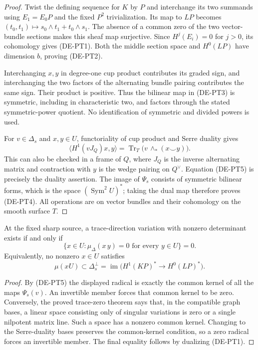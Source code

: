 \begin{proof}
Twist the defining sequence for $K$ by $P$ and interchange its two
summands using $E_1=E_0P$ and the fixed $P^2$ trivialization.
Its map to $LP$ becomes
$(t_0,t_1)\mapsto s_0\wedge t_1+t_0\wedge s_1$.
The absence of a common zero of the two vector-bundle sections makes
this sheaf map surjective. Since $H^j(E_i)=0$ for $j>0$,
its cohomology gives (DE-PT1). Both the middle section space and
$H^0(LP)$ have dimension $b$, proving (DE-PT2).

Interchanging $x,y$ in degree-one cup product contributes its graded
sign, and interchanging the two factors of the alternating bundle
pairing contributes the same sign. Their product is positive.
Thus the bilinear map in (DE-PT3) is symmetric, including in
characteristic two, and factors through the stated symmetric-power
quotient. No identification of symmetric and divided powers is used.

For $v\in\Delta_s$ and $x,y\in U$, functoriality of cup product and
Serre duality gives
\[
\bigl\langle H^1(vJ_Q)x,y\bigr\rangle
=\operatorname{Tr}_T\bigl(v\,\wedge_*(x\mathbin{\smile}y)\bigr).
\tag{DE-PT5}
\]
This can also be checked in a frame of $Q$, where $J_Q$ is the
inverse alternating matrix and contraction with $y$ is the wedge
pairing on $Q^\vee$. Equation (DE-PT5) is precisely the duality
assertion. The image of $\Psi_s$ consists of symmetric bilinear
forms, which is the space $(\operatorname{Sym}^2U)^*$; taking the
dual map therefore proves (DE-PT4). All operations are on vector
bundles and their cohomology on the smooth surface $T$.
\end{proof}

\begin{corollary}
\label{cor:DE-A3-positive-Petri-radical-note}
At the fixed sharp source, a trace-direction variation with nonzero
determinant exists if and only if
\[
\{x\in U:\mu_{\Delta}(x\,y)=0\text{ for every }y\in U\}=0.
\tag{DE-PT6}
\]
Equivalently, no nonzero $x\in U$ satisfies
\[
\mu(xU)\subset\Delta_s^\perp
=\operatorname{im}\bigl(H^1(KP)^*\longrightarrow
H^0(LP)^*\bigr).
\tag{DE-PT7}
\]
\end{corollary}
\begin{proof}
By (DE-PT5) the displayed radical is exactly the common kernel of
all the maps $\Psi_s(v)$. An invertible member forces that common
kernel to be zero. Conversely, the proved trace-zero theorem says
that, in the compatible graph bases, a linear space consisting only
of singular variations is zero or a single nilpotent matrix line.
Such a space has a nonzero common kernel. Changing to the
Serre-duality bases preserves the common-kernel condition, so a zero
radical forces an invertible member. The final equality follows
by dualizing (DE-PT1).
\end{proof}

